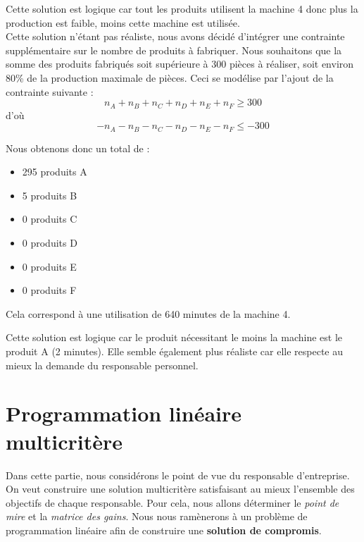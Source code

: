\documentclass[a4paper,10pt]{article}
\begin{document}
Cette solution est logique car tout les produits utilisent la machine 4 donc plus la production est faible, moins cette machine est utilisée.\\

Cette solution n'étant pas réaliste, nous avons décidé d'intégrer une contrainte supplémentaire sur le nombre de produits à fabriquer. Nous souhaitons que la somme des produits fabriqués soit supérieure à 300 pièces à réaliser, soit environ 80\% de la production maximale de pièces.
Ceci se modélise par l'ajout de la contrainte suivante :\\

$$n_A + n_B + n_C + n_D + n_E + n_F \geq 300$$
d'où $$-n_A -n_B -n_C -n_D -n_E -n_F \leq -300$$

Nous obtenons donc un total de :\newline
\begin{itemize}
\item[\textbullet] 295 produits A
\item[\textbullet] 5 produits B
\item[\textbullet] 0 produits C
\item[\textbullet] 0 produits D
\item[\textbullet] 0 produits E
\item[\textbullet] 0 produits F\newline
\end{itemize}
Cela correspond à une utilisation de 640 minutes de la machine 4.\newline

Cette solution est logique car le produit nécessitant le moins la machine est le produit A (2 minutes). Elle semble également plus réaliste car elle respecte au mieux la demande du responsable personnel.



\newpage
\part{Programmation linéaire multicritère}

Dans cette partie, nous considérons le point de vue du responsable d'entreprise. On veut construire une solution multicritère satisfaisant au mieux l'ensemble des objectifs de chaque responsable. Pour cela, nous allons déterminer le \emph{point de mire} et la \emph{matrice des gains}. Nous nous ramènerons à un problème de programmation linéaire afin de construire une \textbf{solution de compromis}.
\end{document}
